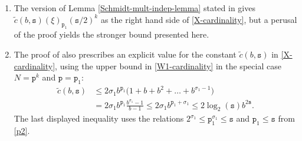 \documentclass[12pt, twoside]{article}
\theoremstyle{definition}
\numberwithin{equation}{section}
\begin{document}
 \begin{enumerate}[1.]
 \item The version of Lemma \ref{Schmidt-mult-indep-lemma} stated in \cite[Lemma 5A]{s60} gives $\widetilde{c}(b, \mathtt s) (\xi)_{\mathtt p_1} (\mathtt s/2)^{k}$ as the right hand side of \eqref{X-cardinality}, but a perusal of the proof yields the stronger bound presented here. 
 \item The proof of \cite[Lemma 5A]{s60} also prescribes an explicit value for the constant $\widetilde{c}(b, \mathtt s)$ in \eqref{X-cardinality}, using the upper bound in \eqref{W1-cardinality} in the special case $N = \mathtt p^k$ and $\mathtt p = \mathtt p_1$: 
\begin{align} 
\widetilde{c}(b, \mathtt s)
 &\leq 2\sigma_1 b^{\mathtt p_1} \bigl(1 + b + b^2 + \ldots + b^{\sigma_1-1}\bigr) \nonumber \\ & = 2 \sigma_1 b^{\mathtt p_1} \frac{b^{\sigma_1}-1}{b-1} \leq  2 \sigma_1 b^{\mathtt p_1 + \sigma_1} \leq 2 \log_2(\mathtt s) b^{2 \mathtt s}. \label{quantitative-cbs}
\end{align} 
The last displayed inequality uses the relations $2^{\sigma_1} \leq \mathtt p_1^{\sigma_1} \leq \mathtt s$ and $\mathtt p_1 \leq \mathtt s$ from \eqref{p2}.
\end{enumerate}  
\end{document}
